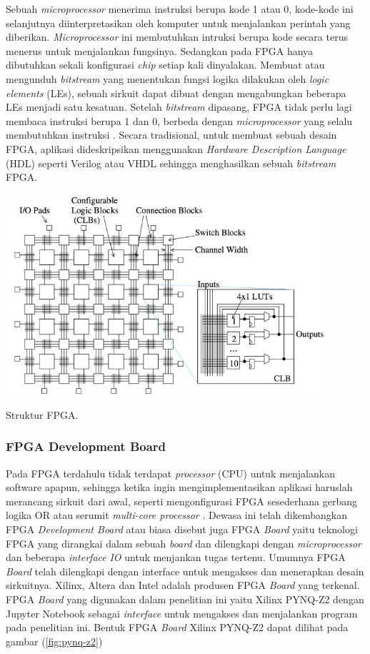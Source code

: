 Sebuah \textit{microprocessor} menerima instruksi berupa kode 1 atau 0, kode-kode ini selanjutnya diinterpretasikan oleh komputer untuk menjalankan perintah yang diberikan. \textit{Microprocessor} ini membutuhkan intruksi berupa kode secara terus menerus untuk menjalankan fungsinya. Sedangkan pada FPGA hanya dibutuhkan sekali konfigurasi \textit{chip} setiap kali dinyalakan. Membuat atau mengunduh \textit{bitstream} yang menentukan fungsi logika dilakukan oleh \textit{logic elements} (LEs), sebuah sirkuit dapat dibuat dengan mengabungkan beberapa LEs menjadi satu kesatuan. Setelah \textit{bitstream} dipasang, FPGA tidak perlu lagi membaca instruksi berupa 1 dan 0, berbeda dengan \textit{microprocessor} yang selalu membutuhkan instruksi . Secara tradisional, untuk membuat sebuah desain FPGA, aplikasi dideskripsikan menggunakan \textit{Hardware Description Language} (HDL) seperti Verilog atau VHDL sehingga menghasilkan sebuah \textit{bitstream} FPGA. 

\begin{afigure}
    \includegraphics[width=12cm, center]{images/fpga-structure.jpeg}
    \caption{Struktur FPGA.}
    \label{fig:fpga-structure}
\end{afigure}

\subsubsection{FPGA Development Board}
Pada FPGA terdahulu tidak terdapat \textit{processor} (CPU) untuk menjalankan software apapun, sehingga ketika ingin mengimplementasikan aplikasi haruslah merancang sirkuit dari awal, seperti mengonfigurasi FPGA sesederhana gerbang logika OR atau serumit \textit{multi-core processor} . Dewasa ini telah dikembangkan FPGA \textit{Development Board} atau biasa disebut juga FPGA \textit{Board} yaitu teknologi FPGA yang dirangkai dalam sebuah \textit{board} dan dilengkapi dengan \textit{microprocessor} dan beberapa \textit{interface} \textit{IO} untuk menjankan tugas tertenu. Umumnya FPGA \textit{Board} telah dilengkapi dengan interface untuk mengakses dan menerapkan desain sirkuitnya. Xilinx, Altera dan Intel adalah produsen FPGA \textit{Board} yang terkenal. FPGA \textit{Board} yang digunakan dalam penelitian ini yaitu Xilinx PYNQ-Z2 dengan Jupyter Notebook sebagai \textit{interface} untuk mengakses dan menjalankan program pada penelitian ini. Bentuk FPGA \textit{Board} Xilinx PYNQ-Z2 dapat dilihat pada gambar (\ref{fig:pynq-z2})

